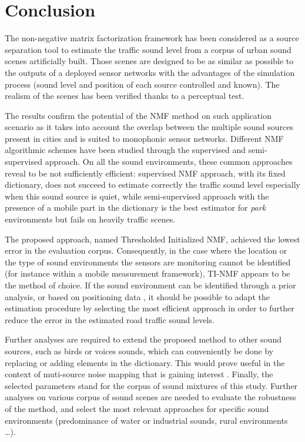 \documentclass[review,5p,twocolumn,sort&compress,times]{elsarticle}
\begin{document}
\section{Conclusion}

The non-negative matrix factorization framework has been considered as a source separation tool to estimate the traffic sound level  from a corpus of urban sound scenes artificially built. Those scenes are designed to be as similar as possible to the outputs of a deployed sensor networks with the advantages of the simulation process (sound level and position of each source controlled and known). The realism of the scenes has been verified thanks to a perceptual test.

The results confirm the potential of the NMF method on such application scenario as it takes into account the overlap between the multiple sound sources present in cities and is suited to monophonic sensor networks. Different NMF algorithmic schemes have been studied through the supervised and semi-supervised approach. On all the sound environments, these common approaches reveal to be not sufficiently efficient: supervised NMF approach, with its fixed dictionary, does not succeed to estimate correctly the traffic sound level especially when this sound source is quiet, while semi-supervised approach with the presence of a mobile part in the dictionary is the best estimator for \textit{park} environments but fails on heavily traffic scenes.

The proposed approach, named Thresholded Initialized NMF, achieved the lowest error in the evaluation corpus. Consequently, in the case where the location or the type of sound environments the sensors are monitoring cannot be identified (for instance within a mobile measurement framework), TI-NMF appears to be the method of choice. If the sound environment can be identified through a prior analysis, or based on positioning data \cite{can2015noise,lavandier2016urban}, it should be possible to adapt the estimation procedure by selecting the most efficient approach in order to further reduce the error in the estimated road traffic sound levels.

Further analyses are required to extend the proposed method to other sound sources, such as birds or voices sounds, which can conveniently be done by replacing or adding elements in the dictionary. This would prove useful in the context of muti-source noise mapping that is  gaining interest \cite{aumond2017Probabilistic, aletta2015soundscape}. Finally, the selected parameters stand for the corpus of sound mixtures of this study. Further analyses on various corpus of sound scenes are needed to evaluate the robustness of the method, and select the most relevant approaches for specific sound environments (predominance of water or industrial sounds, rural environments \dots).
\end{document}
